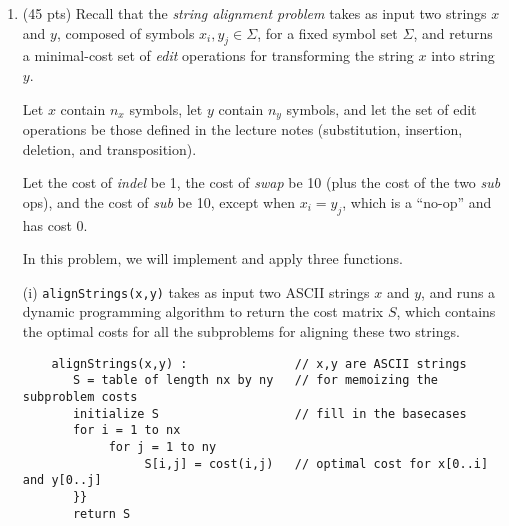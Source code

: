 \documentclass[12pt]{article}
\begin{document}
\renewcommand{\headrulewidth}{0.4pt}


\vspace{-3mm}
\begin{enumerate}
		 

	\item (45 pts) Recall that the \textit{string alignment problem} takes as input two strings $x$ and $y$, composed of symbols $x_{i},y_{j}\in \Sigma$, for a fixed symbol set $\Sigma$, and returns a minimal-cost set of \textit{edit} operations for transforming the string $x$ into string $y$.
	
	Let $x$ contain $n_{x}$ symbols, let $y$ contain $n_{y}$ symbols, and let the set of edit operations be those defined in the lecture notes (substitution, insertion, deletion, and transposition).
	
	Let the cost of \textit{indel} be 1, the cost of \textit{swap} be 10 (plus the cost of the two \textit{sub} ops), and the cost of \textit{sub} be 10, except when $x_{i}=y_{j}$, which is a ``no-op'' and has cost 0.
	
	In this problem, we will implement and apply three functions.
	
	(i) {\tt alignStrings(x,y)} takes as input two ASCII strings $x$ and $y$, and runs a dynamic programming algorithm to return the cost matrix $S$, which contains the optimal costs for all the subproblems for aligning these two strings. 
	\begin{small}
	\begin{verbatim}
	alignStrings(x,y) :               // x,y are ASCII strings
	   S = table of length nx by ny   // for memoizing the subproblem costs
	   initialize S                   // fill in the basecases
	   for i = 1 to nx
	        for j = 1 to ny
	             S[i,j] = cost(i,j)   // optimal cost for x[0..i] and y[0..j]
	   }}
	   return S
	\end{verbatim}
	\end{small}
	

\end{enumerate}
\end{document}
